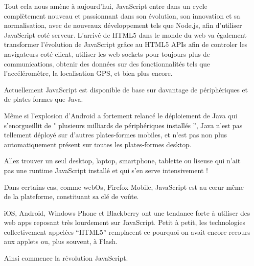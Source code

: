Tout cela nous amène à aujourd’hui, JavaScript entre dans un cycle complètement nouveau et passionnant dans son évolution, son innovation et sa normalisation, avec de nouveaux développement tels que Node.js, afin d’utiliser JavaScript coté serveur. L’arrivé de HTML5 dans le monde du web va également transformer l’évolution de JavaScript grâce au HTML5 APIs afin de controler les navigateurs coté-client, utiliser les web-sockets pour toujours plus de communications, obtenir des données sur des fonctionnalités tels que l'accéléromètre, la localisation GPS, et bien plus encore.

Actuellement JavaScript est disponible de base sur davantage de périphériques et de plates-formes que Java.

Même si l'explosion d’Android a fortement relancé le déploiement de Java qui s'enorgueillit de " plusieurs milliards de périphériques installés ”, Java n’est pas tellement déployé sur d’autres plates-formes mobiles, et n’est pas non plus automatiquement présent sur toutes les plates-formes desktop.

Allez trouver un seul desktop, laptop, smartphone, tablette ou liseuse qui n’ait pas une runtime JavaScript installé et qui s’en serve intensivement !

Dans certains cas, comme webOs, Firefox Mobile, JavaScript est au cœur-même de la plateforme, constituant sa clé de voûte.

iOS, Android, Windows Phone et Blackberry ont une tendance forte à utiliser des web apps reposant très lourdement sur JavaScript. Petit à petit, les technologies collectivement appelées “HTML5” remplacent ce pourquoi on avait encore recours aux applets ou, plus souvent, à Flash.

Ainsi commence la révolution JavaScript.
